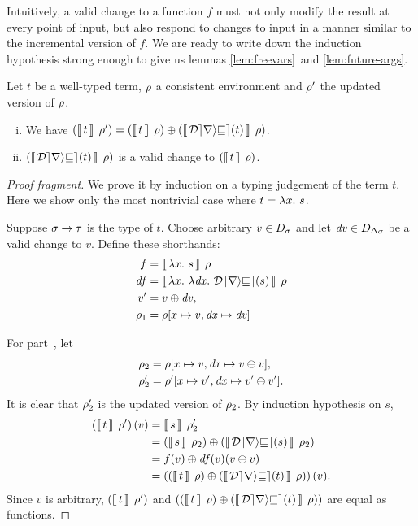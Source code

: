 \begin{oldSec}
Intuitively, a valid change to a function $f$ must not only
modify the result at every point of input, but also respond to
changes to input in a manner similar to the incremental version
of $f$. We are ready to write down the induction hypothesis
strong enough to give us lemmas \ref{lem:freevars}~and
\ref{lem:future-args}.

\begin{lemma}
\label{lem:hypothesis}
Let $t$ be a well-typed term, $\rho$ a consistent environment and
$\rho'$ the updated version of $\rho$.
\begin{enumerate}[(i)]
\item\label{itm:freevars}
We have
$\EvalWith*{t}{\Gr'}=
\Apply{\EvalWith*{\Derive t}\Gr}{\EvalWith*{t}\Gr}$.
\item\label{itm:future-args}
$\EvalWith*{\Derive t}\Gr$ is a valid change to
$\EvalWith*{t}\Gr$.
\end{enumerate}
\end{lemma}

\begin{proof}[Proof fragment]
We prove it by induction on a typing judgement of the term $t$.
Here we show only the most nontrivial case where $t=\Lam x s$.

Suppose $\sigma\to\tau$ is the type of $t$. Choose arbitrary $v\in
D_{\sigma}$ and let $\mathit{dv}\in D_{\Delta\sigma}$ be a valid change to $v$.
Define these shorthands:
\begin{align*}
f     & = \mean[\Gr]{\Lam{x} s} \\
\D f  & = \mean[\Gr]{\Lam{x}{\Lam{\D x}{\Derive s}}} \\
v'    & = \Apply{\D v}v,\\
\Gr_1 & = \Gr[x\mapsto v,\D x\mapsto\D v]
\end{align*}

For part~, let
\begin{align*}
\Gr_2  & = \Gr[x\mapsto v,\D x\mapsto \Diff vv],\\
\Gr_2' & = \Gr'[x\mapsto v',\D x\mapsto \Diff{v'}{v'}].
\end{align*}
It is clear that $\rho_2'$ is the updated version of $\rho_2$. By
induction hypothesis on $s$,
\begin{align*}
\mean*[\Gr']t(v)
& = \mean[\Gr_2']s\\
& = \Apply{\mean*[\Gr_2]{\Derive s}}{\mean*[\Gr_2]s}\\
& = \Apply{\D f(v)(\Diff vv)}{f(v)}\\
& = \Apply*{\mean*[\Gr]{\Derive t}}{\mean*[\Gr]t}(v).
\end{align*}
Since $v$ is arbitrary, $\mean*[\Gr']t$ and
$\Apply*{\mean*[\Gr]{\Derive t}}{\mean*[\Gr]t}$ are equal as
functions.


\end{proof}
\end{oldSec}
